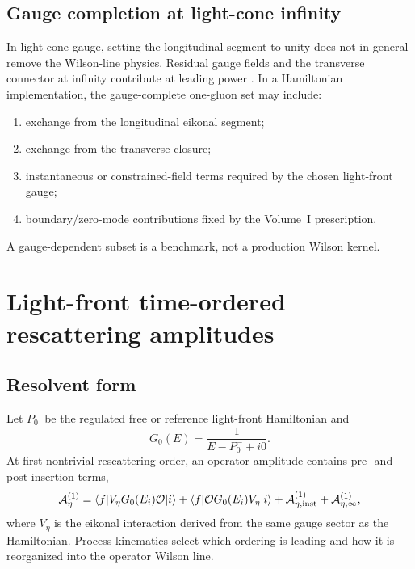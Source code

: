 \documentclass[11pt]{article}
\newcommand{\cO}{\mathcal O}
\newcommand{\cA}{\mathcal A}
\begin{document}
\subsection{Gauge completion at light-cone infinity}

In light-cone gauge, setting the longitudinal segment to unity does not in
general remove the Wilson-line physics.  Residual gauge fields and the
transverse connector at infinity contribute at leading power
\cite{BelitskyJiYuan2003}.  In a Hamiltonian implementation, the gauge-complete
one-gluon set may include:
\begin{enumerate}
\item exchange from the longitudinal eikonal segment;
\item exchange from the transverse closure;
\item instantaneous or constrained-field terms required by the chosen
      light-front gauge;
\item boundary/zero-mode contributions fixed by the Volume~I prescription.
\end{enumerate}
A gauge-dependent subset is a benchmark, not a production Wilson kernel.

\section{Light-front time-ordered rescattering amplitudes}
\label{sec:lf-rescattering}

\subsection{Resolvent form}

Let \(P_0^-\) be the regulated free or reference light-front Hamiltonian and
\begin{equation}
 G_0(E)=\frac{1}{E-P_0^-+i0}.
\label{eq:lf-resolvent}
\end{equation}
At first nontrivial rescattering order, an operator amplitude contains
pre- and post-insertion terms,
\begin{equation}
 \cA_{\eta}^{(1)}
 =\langle f|V_\eta G_0(E_i)\cO|i\rangle
 +\langle f|\cO G_0(E_i)V_\eta|i\rangle
 +\cA_{\eta,\rm inst}^{(1)}
 +\cA_{\eta,\infty}^{(1)},
\label{eq:first-rescattering-amplitude}
\end{equation}
where \(V_\eta\) is the eikonal interaction derived from the same gauge
sector as the Hamiltonian.  Process kinematics select which ordering is
leading and how it is reorganized into the operator Wilson line.
\end{document}
